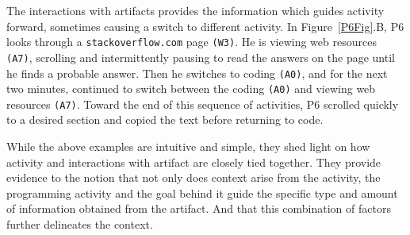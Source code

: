 The interactions with artifacts provides the information which guides activity forward, sometimes causing a switch to different activity. In Figure~\ref{P6Fig}.B, P6 looks through a \texttt{stackoverflow.com} page \texttt{(W3)}. He is viewing web resources \texttt{(A7)}, scrolling and intermittently pausing to read the answers on the page until he finds a probable answer. Then he switches to coding \texttt{(A0)}, and for the next two minutes, continued to switch between the coding \texttt{(A0)} and viewing web resources \texttt{(A7)}. Toward the end of this sequence of activities, P6 scrolled quickly to a desired section and copied the text before returning to code.


While the above examples are intuitive and simple, they shed light on how activity and interactions with artifact are closely tied together. They provide evidence to the notion that not only does context arise from the activity, the programming activity and the goal behind it guide the specific type and amount of information obtained from the artifact. And that this combination of factors further delineates the context.








